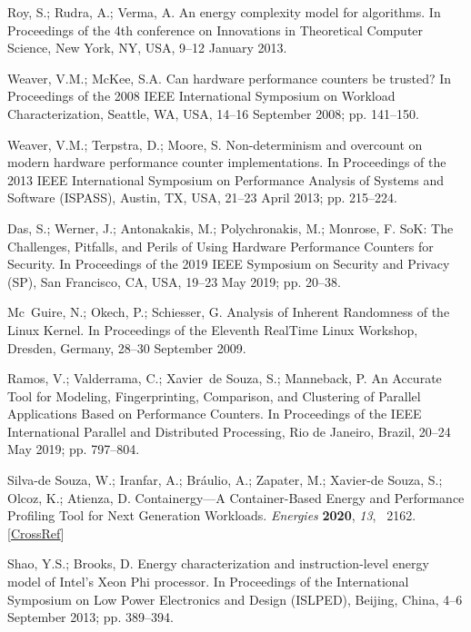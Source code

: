 \begin{thebibliography}{999}
	Roy, S.; Rudra, A.; Verma, A. An energy complexity model for algorithms. In Proceedings of the 4th conference on Innovations in Theoretical Computer Science, New York, NY, USA, 9--12 January 2013.
	
	Weaver, V.M.; McKee, S.A. Can hardware performance counters be trusted? {In Proceedings of the 2008 IEEE International Symposium on Workload Characterization, Seattle, WA, USA, 14--16 September 2008}; pp. 141--150.
	
	Weaver, V.M.; Terpstra, D.; Moore, S. Non-determinism and overcount on modern hardware performance counter implementations. {In Proceedings of the 2013 IEEE International Symposium on Performance Analysis of Systems and Software (ISPASS), Austin, TX, USA, 21--23 April 2013}; pp. 215--224.
	
	Das, S.; Werner, J.; Antonakakis, M.; Polychronakis, M.; Monrose, F. SoK: The Challenges, Pitfalls, and Perils of Using Hardware Performance Counters for Security. {In Proceedings of the 2019 IEEE Symposium on Security and Privacy (SP), San Francisco, CA, USA, 19--23 May 2019}; pp. 20--38.
	
	Mc~Guire, N.; Okech, P.; Schiesser, G. Analysis of Inherent Randomness of the Linux Kernel. {In Proceedings of the Eleventh RealTime Linux Workshop, Dresden, Germany, 28–30 September 2009}.
	
	Ramos, V.; Valderrama, C.; Xavier~de Souza, S.; Manneback, P. An Accurate Tool for Modeling, Fingerprinting, Comparison, and Clustering of Parallel Applications Based on Performance Counters. {In Proceedings of the  IEEE International Parallel and Distributed Processing, Rio de Janeiro, Brazil, 20--24 May 2019}; pp. 797--804.
	
	Silva-de Souza, W.; Iranfar, A.; Br{\'{a}}ulio, A.; Zapater, M.; Xavier-de Souza, S.; Olcoz, K.; Atienza, D. Containergy—A Container-Based Energy and Performance Profiling Tool for Next Generation Workloads. {\em Energies} {\bf 2020}, {\em 13}, ~2162. [\href{http://dx.doi.org/10.3390/en13092162}{CrossRef}]
	
	Shao, Y.S.; Brooks, D. Energy characterization and instruction-level energy model of Intel's Xeon Phi processor. In Proceedings of the  International Symposium on Low Power Electronics and Design (ISLPED), Beijing, China, 4--6 September 2013; pp. 389--394.
	

\end{thebibliography}

